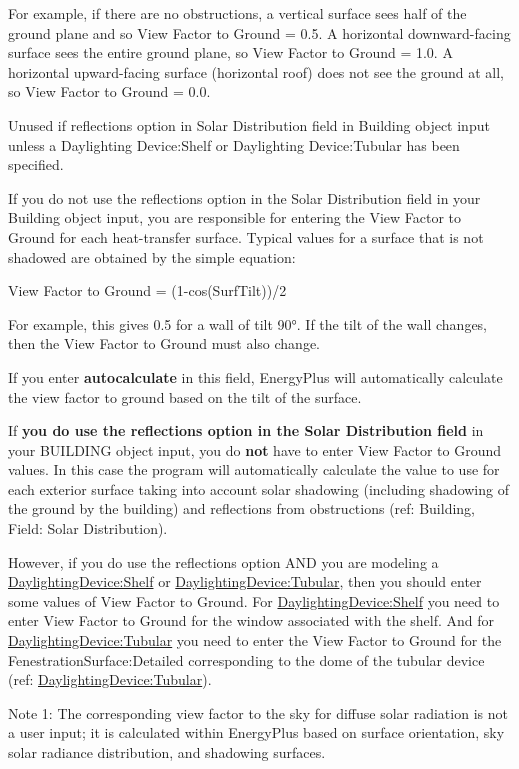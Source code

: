 For example, if there are no obstructions, a vertical surface sees half of the ground plane and so View Factor to Ground = 0.5. A horizontal downward-facing surface sees the entire ground plane, so View Factor to Ground = 1.0. A horizontal upward-facing surface (horizontal roof) does not see the ground at all, so View Factor to Ground = 0.0.

Unused if reflections option in Solar Distribution field in Building object input unless a Daylighting Device:Shelf or Daylighting Device:Tubular has been specified.

If you do not use the reflections option in the Solar Distribution field in your Building object input, you are responsible for entering the View Factor to Ground for each heat-transfer surface. Typical values for a surface that is not shadowed are obtained by the simple equation:

View Factor to Ground = (1-cos(SurfTilt))/2

For example, this gives 0.5 for a wall of tilt 90°. If the tilt of the wall changes, then the View Factor to Ground must also change.

If you enter \textbf{autocalculate} in this field, EnergyPlus will automatically calculate the view factor to ground based on the tilt of the surface.

If \textbf{you do use the reflections option in the Solar Distribution field} in your BUILDING object input, you do \textbf{not} have to enter View Factor to Ground values. In this case the program will automatically calculate the value to use for each exterior surface taking into account solar shadowing (including shadowing of the ground by the building) and reflections from obstructions (ref: Building, Field: Solar Distribution).

However, if you do use the reflections option AND you are modeling a \hyperref[daylightingdeviceshelf]{DaylightingDevice:Shelf} or \hyperref[daylightingdevicetubular]{DaylightingDevice:Tubular}, then you should enter some values of View Factor to Ground. For \hyperref[daylightingdeviceshelf]{DaylightingDevice:Shelf} you need to enter View Factor to Ground for the window associated with the shelf. And for \hyperref[daylightingdevicetubular]{DaylightingDevice:Tubular} you need to enter the View Factor to Ground for the FenestrationSurface:Detailed corresponding to the dome of the tubular device (ref: \hyperref[daylightingdevicetubular]{DaylightingDevice:Tubular}).

Note 1: The corresponding view factor to the sky for diffuse solar radiation is not a user input; it is calculated within EnergyPlus based on surface orientation, sky solar radiance distribution, and shadowing surfaces.


